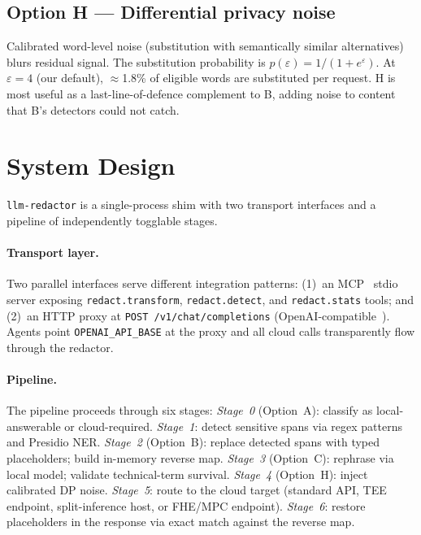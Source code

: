 \documentclass[11pt,a4paper]{article}
\begin{document}
\subsection{Option H --- Differential privacy noise}

Calibrated word-level noise (substitution with semantically
similar alternatives) blurs residual signal.  The substitution
probability is $p(\varepsilon) = 1/(1 + e^\varepsilon)$.
At $\varepsilon = 4$ (our default), $\approx$1.8\% of eligible
words are substituted per request.  H is most useful as a
last-line-of-defence complement to B, adding noise to content
that B's detectors could not catch.

\section{System Design}
\label{sec:system}

\texttt{llm-redactor} is a single-process shim with two transport
interfaces and a pipeline of independently togglable stages.

\paragraph{Transport layer.}
Two parallel interfaces serve different integration patterns:
(1)~an MCP~\cite{mcp} stdio server exposing \texttt{redact.transform},
\texttt{redact.detect}, and \texttt{redact.stats} tools; and
(2)~an HTTP proxy at \texttt{POST /v1/chat/completions}
(OpenAI-compatible~\cite{openai-api}).  Agents point
\texttt{OPENAI\_API\_BASE} at the proxy and all cloud calls
transparently flow through the redactor.

\paragraph{Pipeline.}
The pipeline proceeds through six stages:
\emph{Stage~0} (Option~A): classify as local-answerable or
cloud-required.
\emph{Stage~1}: detect sensitive spans via regex patterns and
Presidio NER.
\emph{Stage~2} (Option~B): replace detected spans with typed
placeholders; build in-memory reverse map.
\emph{Stage~3} (Option~C): rephrase via local model; validate
technical-term survival.
\emph{Stage~4} (Option~H): inject calibrated DP noise.
\emph{Stage~5}: route to the cloud target (standard API, TEE
endpoint, split-inference host, or FHE/MPC endpoint).
\emph{Stage~6}: restore placeholders in the response via exact
match against the reverse map.
\end{document}
